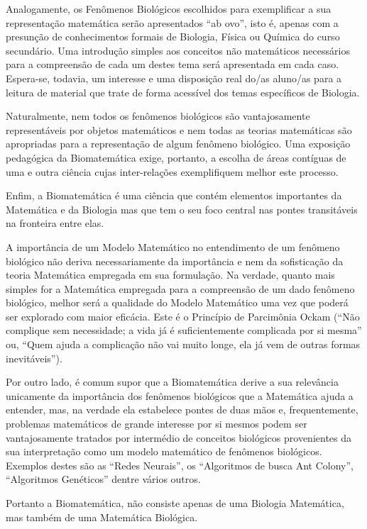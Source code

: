 Analogamente, os Fenômenos Biológicos escolhidos para exemplificar a sua representação matemática serão apresentados ``ab ovo”, isto é, apenas com a presunção de conhecimentos formais de Biologia, Física ou Química do curso secundário. Uma introdução simples aos conceitos não matemáticos necessários para a compreensão de cada um destes tema será apresentada em cada caso. Espera-se, todavia, um interesse e uma disposição real do/as aluno/as para a leitura de material que trate de forma
acessível dos temas específicos de Biologia.

Naturalmente, nem todos os fenômenos biológicos são vantajosamente representáveis por objetos matemáticos e nem todas as teorias matemáticas são apropriadas para a representação de algum fenômeno biológico. Uma exposição pedagógica da Biomatemática exige, portanto, a escolha de áreas contíguas de uma e outra ciência cujas inter-relações exemplifiquem melhor este processo.

Enfim, a Biomatemática é uma ciência que contém elementos importantes da Matemática e da Biologia mas que tem o seu foco central nas pontes transitáveis na fronteira entre elas.

A importância de um Modelo Matemático no entendimento de um fenômeno biológico não deriva necessariamente da importância e nem da sofisticação da teoria Matemática empregada em sua formulação. Na verdade, quanto mais simples for a Matemática empregada para a compreensão de um dado fenômeno biológico, melhor será a qualidade do Modelo Matemático uma vez que poderá ser explorado com maior eficácia. Este é o Princípio de Parcimônia Ockam (``Não complique sem necessidade; a vida já é suficientemente complicada por si mesma'' ou, ``Quem ajuda a complicação não vai muito longe, ela já vem de outras formas inevitáveis'').

Por outro lado, é comum supor que a Biomatemática derive a sua relevância unicamente da importância dos fenômenos biológicos que a Matemática ajuda a entender, mas, na verdade ela estabelece pontes de duas mãos e, frequentemente, problemas matemáticos de grande interesse por si mesmos podem ser vantajosamente tratados por intermédio de conceitos biológicos provenientes da sua interpretação como um modelo matemático de fenômenos biológicos. Exemplos destes são as ``Redes Neurais'', os
``Algoritmos de busca Ant Colony'', ``Algoritmos Genéticos'' dentre vários outros.

Portanto a Biomatemática, não consiste apenas de uma Biologia Matemática, mas também de uma Matemática Biológica.

